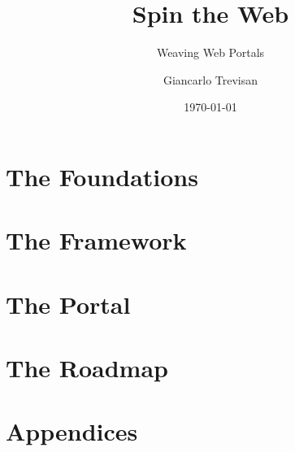 \documentclass[11pt,openright,twoside,a4paper]{book}
\title{Spin the Web}
\subtitle{Weaving Web Portals}
\author{Giancarlo Trevisan}
\date{\today}
\begin{document}
\frontmatter






\setcounter{tocdepth}{0}
\tableofcontents

\mainmatter

\part{The Foundations}






\part{The Framework}









\part{The Portal}




\part{The Roadmap}



\part*{Appendices}
\appendix




\backmatter
\begingroup
	\nocite{*}
	
	
\endgroup
\glsaddall
\printglossary
\printindex
\end{document}
